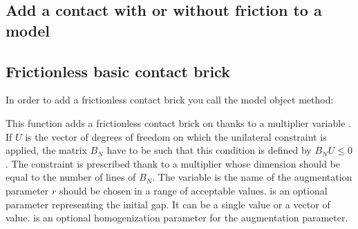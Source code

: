 \documentclass[a4paper,11pt,english]{sphinxmanual}
\begin{document}
\begin{figure}[htbp]
\centering

\noindent{}
\end{figure}


\subsection{Add a contact with or without friction to a model}
\label{\detokenize{userdoc/model_contact_friction:add-a-contact-with-or-without-friction-to-a-model}}

\subsection{Frictionless basic contact brick}
\label{\detokenize{userdoc/model_contact_friction:frictionless-basic-contact-brick}}
In order to add a frictionless contact brick you call the model object method:

\begin{sphinxVerbatim}[commandchars=\\\{\}]
            
\end{sphinxVerbatim}

This function adds a frictionless contact brick on  thanks to a multiplier variable . If \(U\) is the vector of degrees of freedom on which the unilateral constraint is applied, the matrix \(B_N\) have to be such that this condition is defined by \(B_N U \le 0\). The constraint is prescribed thank to a multiplier  whose dimension should be equal to the number of lines of \(B_N\). The variable  is the name of the augmentation parameter \(r\) should be chosen in a range of acceptable values.  is an optional parameter representing the initial gap. It can be a single value or a vector of value.  is an optional homogenization parameter for the augmentation parameter.
\end{document}
